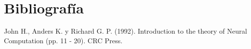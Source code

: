 \documentclass{article}
\begin{document}
\section{Bibliografía}

\begin{thebibliography}{9}

 John H., Anders K. y Richard G. P. (1992). Introduction to the theory of Neural
Computation (pp. 11 - 20). CRC Press.


\end{thebibliography}
\end{document}
